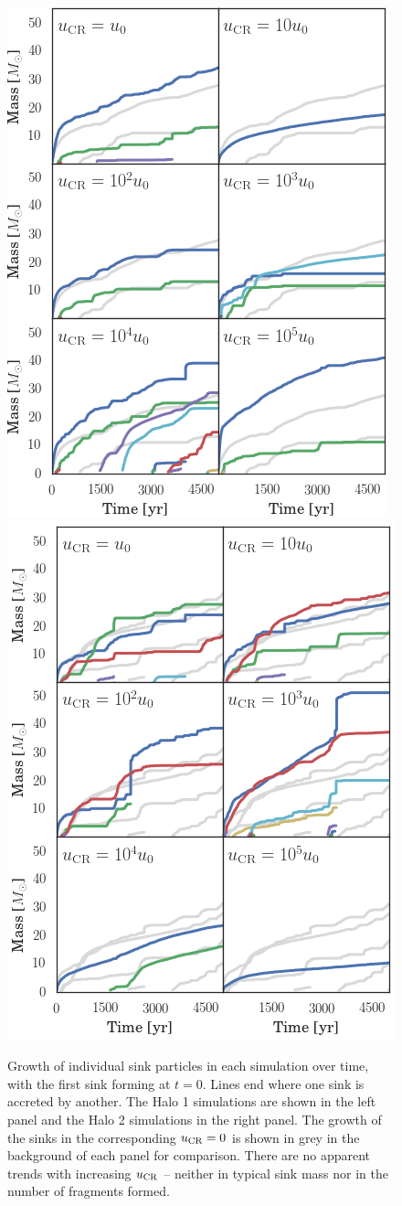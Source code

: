 \documentclass[usenatbib]{mn2e}
\newcommand{\ucr}{{u}_{\rm \small CR}}
\begin{document}
\begin{figure}
\begin{center}
\includegraphics[width=.49\textwidth]{figures/sink_masses/sink_masses_halo1}
\includegraphics[width=.49\textwidth]{figures/sink_masses/sink_masses_halo2}
\caption{\label{fig:sinks} 
Growth of individual sink particles in each simulation over time, with the first sink forming at $t=0$. 
Lines end where one sink is accreted by another. 
The Halo 1 simulations are shown in the left panel and the Halo 2 simulations in the right panel.  
The growth of the sinks in the corresponding $\ucr=0$ is shown in grey in the background of each panel for comparison. 
There are no apparent trends with increasing $\ucr$ -- neither in typical sink mass nor in the number of fragments formed.%
}
\end{center}
\end{figure}
\end{document}
